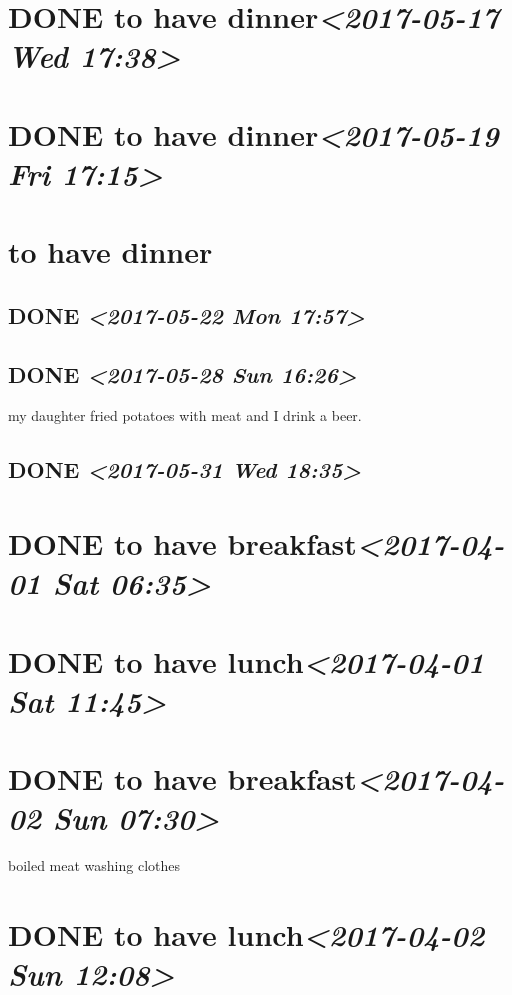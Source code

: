 \documentclass[cyan]{elegantnote}
\begin{document}
\section{{\bfseries\sffamily DONE} to have dinner\textit{<2017-05-17 Wed 17:38>}}
\label{sec:orgdd1fdfd}
\section{{\bfseries\sffamily DONE} to have dinner\textit{<2017-05-19 Fri 17:15>}}
\label{sec:org4315034}
\section{to have dinner}
\label{sec:orga06d3e2}
\subsection{{\bfseries\sffamily DONE} \textit{<2017-05-22 Mon 17:57>}}
\label{sec:org1832715}
\subsection{{\bfseries\sffamily DONE} \textit{<2017-05-28 Sun 16:26>}}
\label{sec:orgf917f8c}
my daughter fried potatoes with meat and I drink a beer.
\subsection{{\bfseries\sffamily DONE} \textit{<2017-05-31 Wed 18:35>}}
\label{sec:orga04c4d6}
\section{{\bfseries\sffamily DONE} to have breakfast\textit{<2017-04-01 Sat 06:35>}}
\label{sec:org7a8fe7b}
\section{{\bfseries\sffamily DONE} to have lunch\textit{<2017-04-01 Sat 11:45>}}
\label{sec:org32a521a}
\section{{\bfseries\sffamily DONE} to have breakfast\textit{<2017-04-02 Sun 07:30>}}
\label{sec:org5e69edd}
boiled meat
washing clothes
\section{{\bfseries\sffamily DONE} to have lunch\textit{<2017-04-02 Sun 12:08>}}
\label{sec:orgdb258d7}
\end{document}
